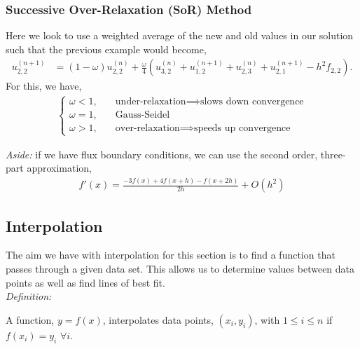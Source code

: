 \documentclass[11pt,a4paper]{report}
\begin{document}
		\subsubsection{Successive Over-Relaxation (SoR) Method}
			Here we look to use a weighted average of the new and old values in our solution such that the previous example would become,
			\begin{align}
				u_{2,2}^{(n+1)} &= (1-\omega)u_{2,2}^{(n)} + \frac{\omega}{4} \left( u_{3,2}^{(n)} + u_{1,2}^{(n+1)} + u_{2,3}^{(n)} + u_{2,1}^{(n+1)} - h^2 f_{2,2} \right).
			\end{align}
			For this, we have,
			\begin{align*}
				\begin{cases}
					\omega < 1, \quad& \text{under-relaxation} \implies \text{slows down convergence} \\
					\omega = 1, \quad& \text{Gauss-Seidel} \\
					\omega > 1, \quad& \text{over-relaxation}  \implies \text{speeds up convergence}
				\end{cases}
			\end{align*}
			
		\textit{Aside:} if we have flux boundary conditions, we can use the second order, three-part approximation,
		\begin{align}
			f'(x) = \frac{-3f(x) + 4f(x+h) - f(x+2h)}{2h} + O(h^2)
		\end{align}
		
		\subsection{Interpolation}
			The aim we have with interpolation for this section is to find a function that passes through a given data set. This allows us to determine values between data points as well as find lines of best fit. \\
			\textit{Definition:} 
			\begin{center}
			A function, $y=f(x)$, interpolates data points, $(x_i,y_i)$, with $1\leq i \leq n$ if $f(x_i) = y_i$ $\forall i$.
			\end{center}
		
\end{document}
